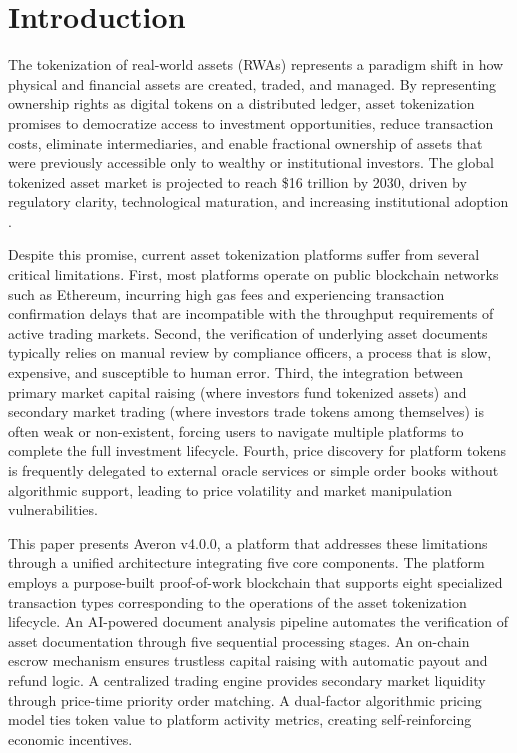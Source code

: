 \documentclass[conference]{IEEEtran}
\begin{document}
\section{Introduction}
\label{sec:intro}

The tokenization of real-world assets (RWAs) represents a paradigm shift in how physical and financial assets are created, traded, and managed. By representing ownership rights as digital tokens on a distributed ledger, asset tokenization promises to democratize access to investment opportunities, reduce transaction costs, eliminate intermediaries, and enable fractional ownership of assets that were previously accessible only to wealthy or institutional investors. The global tokenized asset market is projected to reach \$16 trillion by 2030, driven by regulatory clarity, technological maturation, and increasing institutional adoption \cite{ref1}.

Despite this promise, current asset tokenization platforms suffer from several critical limitations. First, most platforms operate on public blockchain networks such as Ethereum, incurring high gas fees and experiencing transaction confirmation delays that are incompatible with the throughput requirements of active trading markets. Second, the verification of underlying asset documents typically relies on manual review by compliance officers, a process that is slow, expensive, and susceptible to human error. Third, the integration between primary market capital raising (where investors fund tokenized assets) and secondary market trading (where investors trade tokens among themselves) is often weak or non-existent, forcing users to navigate multiple platforms to complete the full investment lifecycle. Fourth, price discovery for platform tokens is frequently delegated to external oracle services or simple order books without algorithmic support, leading to price volatility and market manipulation vulnerabilities.

This paper presents Averon v4.0.0, a platform that addresses these limitations through a unified architecture integrating five core components. The platform employs a purpose-built proof-of-work blockchain that supports eight specialized transaction types corresponding to the operations of the asset tokenization lifecycle. An AI-powered document analysis pipeline automates the verification of asset documentation through five sequential processing stages. An on-chain escrow mechanism ensures trustless capital raising with automatic payout and refund logic. A centralized trading engine provides secondary market liquidity through price-time priority order matching. A dual-factor algorithmic pricing model ties token value to platform activity metrics, creating self-reinforcing economic incentives.
\end{document}
